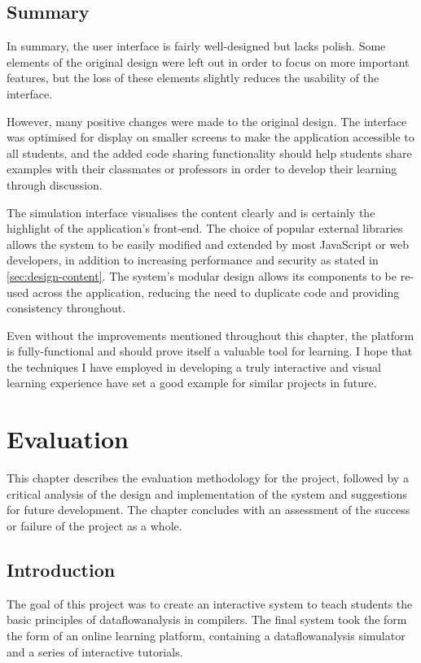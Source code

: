 \documentclass[bsc,twoside,singlespacing,parskip,logo,notimes,normalheadings]{infthesis}
\begin{document}
        \section{Summary}
        In summary, the user interface is fairly well-designed but
        lacks polish. Some elements of the original design were left
        out in order to focus on more important features, but the loss
        of these elements slightly reduces the usability of the
        interface.

        However, many positive changes were made to the original
        design. The interface was optimised for display on smaller
        screens to make the application accessible to all students,
        and the added code sharing functionality should help students
        share examples with their classmates or professors in order to
        develop their learning through discussion.

        The simulation interface visualises the content clearly and is
        certainly the highlight of the application's front-end. The
        choice of popular external libraries allows the system to be
        easily modified and extended by most JavaScript or web
        developers, in addition to increasing performance and security
        as stated in \ref{sec:design-content}. The system's modular
        design allows its components to be re-used across the
        application, reducing the need to duplicate code and providing
        consistency throughout.

        Even without the improvements mentioned throughout this
        chapter, the platform is fully-functional and should prove
        itself a valuable tool for learning. I hope that the
        techniques I have employed in developing a truly interactive
        and visual learning experience have set a good example for
        similar projects in future.

\chapter{Evaluation}
This chapter describes the evaluation methodology for the project,
followed by a critical analysis of the design and implementation of
the system and suggestions for future development. The chapter
concludes with an assessment of the success or failure of the project
as a whole.

    \section{Introduction}
    The goal of this project was to create an interactive system to
    teach students the basic principles of \gls{dataflowanalysis} in
    compilers. The final system took the form the form of an online
    learning platform, containing a \gls{dataflowanalysis} simulator
    and a series of interactive tutorials.
\end{document}
